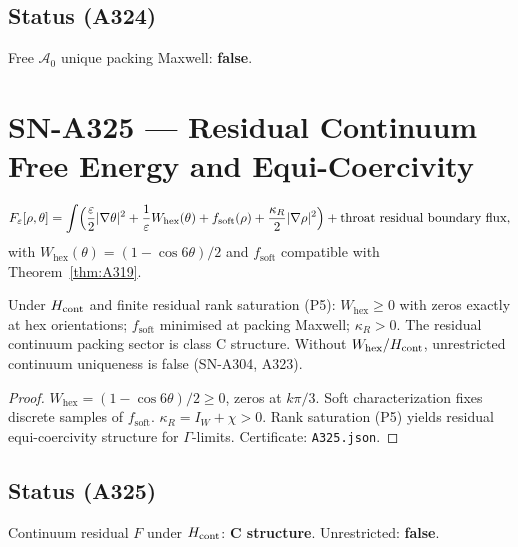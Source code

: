 \subsection*{Status (A324)}
Free $\mathcal{A}_0$ unique packing Maxwell: \textbf{false}.

\section{SN-A325 --- Residual Continuum Free Energy and Equi-Coercivity}
\label{sec:SN-A325}

\begin{definition}
\label{def:A325-F}
\begin{equation}
F_\varepsilon[\rho,\theta]
=
\int
\Bigl(
\frac{\varepsilon}{2}|\nabla\theta|^2
+
\frac{1}{\varepsilon}W_{\mathrm{hex}}(\theta)
+
f_{\mathrm{soft}}(\rho)
+
\frac{\kappa_R}{2}|\nabla\rho|^2
\Bigr)
+
\text{throat residual boundary flux},
\end{equation}
with $W_{\mathrm{hex}}(\theta)=(1-\cos 6\theta)/2$ and $f_{\mathrm{soft}}$ compatible with Theorem~\ref{thm:A319}.
\end{definition}

\begin{theorem}
\label{thm:A325}
Under $H_{\rm cont}$ and finite residual rank saturation (P5): $W_{\mathrm{hex}}\ge 0$ with zeros exactly at hex orientations; $f_{\mathrm{soft}}$ minimised at packing Maxwell; $\kappa_R>0$. The residual continuum packing sector is class C structure. Without $W_{\mathrm{hex}}/H_{\rm cont}$, unrestricted continuum uniqueness is false (SN-A304, A323).
\end{theorem}

\begin{proof}
$W_{\mathrm{hex}}=(1-\cos 6\theta)/2\ge 0$, zeros at $k\pi/3$. Soft characterization fixes discrete samples of $f_{\mathrm{soft}}$. $\kappa_R=I_W+\chi>0$. Rank saturation (P5) yields residual equi-coercivity structure for $\Gamma$-limits. Certificate: \texttt{A325.json}.
\end{proof}

\subsection*{Status (A325)}
Continuum residual $F$ under $H_{\rm cont}$: \textbf{C structure}. Unrestricted: \textbf{false}.

